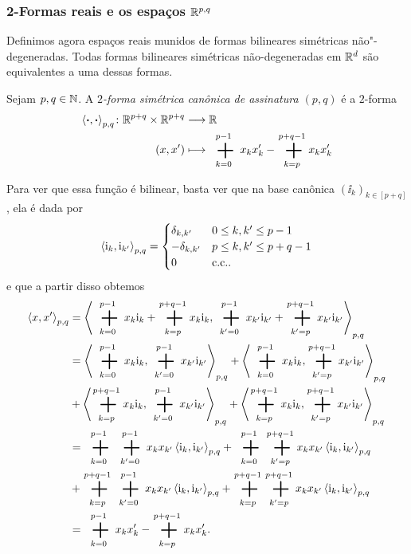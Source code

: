 \subsubsection{2-Formas reais e os espaços \texorpdfstring{\ensuremath{\R^{p,q}}}{(p,q)-hiperbólicos reais}}

Definimos agora espaços reais munidos de formas bilineares simétricas não"-degeneradas. Todas formas bilineares simétricas não-degeneradas em $\mathbb{R}^d$ são equivalentes a uma dessas formas.

\begin{definition}
Sejam $p,q \in \mathbb{N}$. A \emph{$2$-forma simétrica canônica de assinatura $(p,q)$} é a $2$-forma
	\begin{align*}
	\func{\inte{\var}{\var}_{p,q}}{\R^{p+q} \times \R^{p+q}}{\R}{(x,x')}{\sum_{k=0}^{p-1} x_k x'_k - \sum_{k=p}^{p+q-1} x_k x'_k}
	\end{align*}
\end{definition}

Para ver que essa função é bilinear, basta ver que na base canônica $(\ii_k)_{k \in [p+q]}$, ela é dada por
	\begin{equation*}
	\left\langle{\mathrm{i}_k},{\mathrm{i}_{k'}}\right\rangle_{p,q} =
		\begin{cases}
		\delta_{k,k'}	& 0 \leq k,k' \leq p-1 \\
		-\delta_{k,k'}	& p \leq k,k' \leq p+q-1 \\
		0				& \text{c.c.}.
		\end{cases}
	\end{equation*}
e que a partir disso obtemos
	\begin{align*}
	\inte{x}{x'}_{p,q} &= \inte{\sum_{k=0}^{p-1} x_k\ii_k + \sum_{k=p}^{p+q-1} x_k\ii_k}{\sum_{k'=0}^{p-1} x_{k'}\ii_{k'} + \sum_{k'=p}^{p+q-1} x_{k'}\ii_{k'}}_{p,q} \\
		&= \inte{\sum_{k=0}^{p-1} x_k\ii_k}{\sum_{k'=0}^{p-1} x_{k'}\ii_{k'}}_{p,q} + \inte{\sum_{k=0}^{p-1} x_k\ii_k}{\sum_{k'=p}^{p+q-1} x_{k'}\ii_{k'}}_{p,q} \\
		&+ \inte{\sum_{k=p}^{p+q-1} x_k\ii_k}{\sum_{k'=0}^{p-1} x_{k'}\ii_{k'}}_{p,q} + \inte{\sum_{k=p}^{p+q-1} x_k\ii_k}{\sum_{k'=p}^{p+q-1} x_{k'}\ii_{k'}}_{p,q} \\
		&= \sum_{k=0}^{p-1} \sum_{k'=0}^{p-1} x_kx_{k'}\inte{\ii_k}{\ii_{k'}}_{p,q} + \sum_{k=0}^{p-1} \sum_{k'=p}^{p+q-1} x_k x_{k'} \inte{\ii_k}{\ii_{k'}}_{p,q} \\
		&+ \sum_{k=p}^{p+q-1} \sum_{k'=0}^{p-1} x_k x_{k'} \inte{\ii_k}{\ii_{k'}}_{p,q} + \sum_{k=p}^{p+q-1} \sum_{k'=p}^{p+q-1} x_k x_{k'} \inte{\ii_k}{\ii_{k'}}_{p,q} \\
		&= \sum_{k=0}^{p-1} x_k x'_k - \sum_{k=p}^{p+q-1} x_k x'_k.
	\end{align*}

